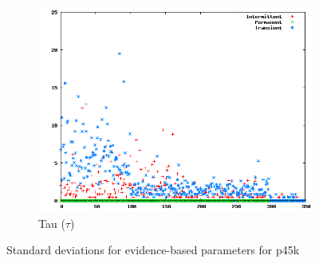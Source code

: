 \begin{figure}
\begin{subfigure}[h]{0.45\linewidth}
                \includegraphics[scale=0.32]{figures/sdtaup45k.png}
                \caption{Tau ($\tau$)}
        \end{subfigure}
        \caption{Standard deviations for evidence-based parameters for p45k}
        \label{fig:sdevidance} 
\end{figure}


